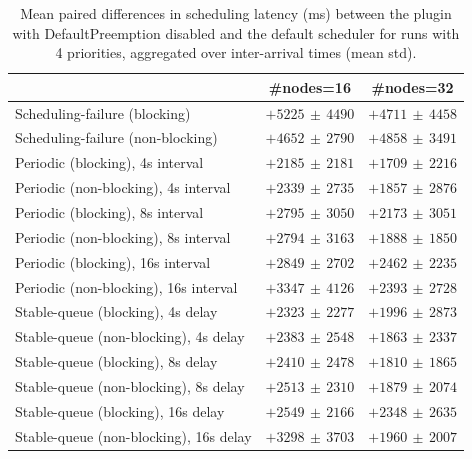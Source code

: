 \begin{table}[t]
\tiny
\setlength{\tabcolsep}{1.2pt}
\renewcommand{\arraystretch}{1.12}
\centering
\caption{Mean paired differences in scheduling latency (ms) between the plugin with DefaultPreemption disabled and the default scheduler for runs with 4 priorities, aggregated over inter-arrival times (mean \pm std).}
\label{tab:latency-defpreempt0-prio4-std1-agg-arrival}
\begin{tabular}{l c c}
\toprule
 & \#nodes=16 & \#nodes=32 \\
\midrule
Scheduling-failure (blocking) & $+5225\,\pm\,4490$ & $+4711\,\pm\,4458$ \\
Scheduling-failure (non-blocking) & $+4652\,\pm\,2790$ & $+4858\,\pm\,3491$ \\
Periodic (blocking), 4s interval & $+2185\,\pm\,2181$ & $+1709\,\pm\,2216$ \\
Periodic (non-blocking), 4s interval & $+2339\,\pm\,2735$ & $+1857\,\pm\,2876$ \\
Periodic (blocking), 8s interval & $+2795\,\pm\,3050$ & $+2173\,\pm\,3051$ \\
Periodic (non-blocking), 8s interval & $+2794\,\pm\,3163$ & $+1888\,\pm\,1850$ \\
Periodic (blocking), 16s interval & $+2849\,\pm\,2702$ & $+2462\,\pm\,2235$ \\
Periodic (non-blocking), 16s interval & $+3347\,\pm\,4126$ & $+2393\,\pm\,2728$ \\
Stable-queue (blocking), 4s delay & $+2323\,\pm\,2277$ & $+1996\,\pm\,2873$ \\
Stable-queue (non-blocking), 4s delay & $+2383\,\pm\,2548$ & $+1863\,\pm\,2337$ \\
Stable-queue (blocking), 8s delay & $+2410\,\pm\,2478$ & $+1810\,\pm\,1865$ \\
Stable-queue (non-blocking), 8s delay & $+2513\,\pm\,2310$ & $+1879\,\pm\,2074$ \\
Stable-queue (blocking), 16s delay & $+2549\,\pm\,2166$ & $+2348\,\pm\,2635$ \\
Stable-queue (non-blocking), 16s delay & $+3298\,\pm\,3703$ & $+1960\,\pm\,2007$ \\
\bottomrule
\end{tabular}
\end{table}
